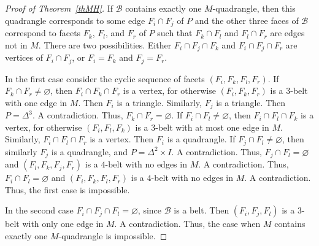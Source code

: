 \documentclass[12pt]{amsart}
\theoremstyle{definition}
\theoremstyle{remark}
\begin{document}
\begin{proof}[Proof of Theorem~\ref{thMH}]
If $\mathcal{B}$ contains exactly one $M$-quadrangle, then this quadrangle corresponds to some edge 
$F_i\cap F_j$ of $P$ and the other three faces of $\mathcal{B}$ correspond to facets $F_k$, $F_l$, and $F_r$ of $P$
such that $F_k\cap F_l$ and $F_l\cap F_r$ are edges not in $M$.
There are two possibilities. Either $F_i\cap F_j\cap F_k$ and $F_i\cap F_j\cap F_r$ are vertices of $F_i\cap F_j$, or $F_i=F_k$ 
and $F_j=F_r$. 

In the first case consider the cyclic sequence of facets $(F_i,F_k, F_l,F_r)$.  If $F_k\cap F_r\ne \varnothing$,
then $F_i\cap F_k\cap F_r$  is a vertex, for otherwise $(F_i,F_k,F_r)$ is a $3$-belt with one edge in $M$. Then $F_i$
is a triangle. Similarly, $F_j$ is a triangle. Then $P=\Delta^3$. A contradiction. Thus, $F_k\cap F_r=\varnothing$.
If $F_i\cap F_l\ne\varnothing$, then $F_i\cap F_l\cap F_k$ is a vertex, for otherwise $(F_i,F_l,F_k)$ is a $3$-belt
with at most one edge in $M$. Similarly, $F_i\cap F_l\cap F_r$ is a vertex. Then $F_i$ is a quadrangle. 
If $F_j\cap F_l\ne\varnothing$, then similarly $F_j$ is a quadrangle, and $P=\Delta^2\times I$. A contradiction. Thus,
$F_j\cap F_l=\varnothing$ and $(F_l,F_k,F_j,F_r)$ is a $4$-belt with no edges in $M$. A contradiction. Thus, $F_i\cap F_l=\varnothing$ and $(F_i,F_k,F_l,F_r)$ is a $4$-belt with no edges in $M$. A contradiction. Thus, the first case is impossible.

In the second case $F_i\cap F_j\cap F_l=\varnothing$, since $\mathcal{B}$ is a belt. Then $(F_i,F_j,F_l)$ is a $3$-belt
with only one edge in $M$. A contradiction. Thus, the case when $M$ contains exactly one $M$-quadrangle is impossible. 


\end{proof}
\end{document}

